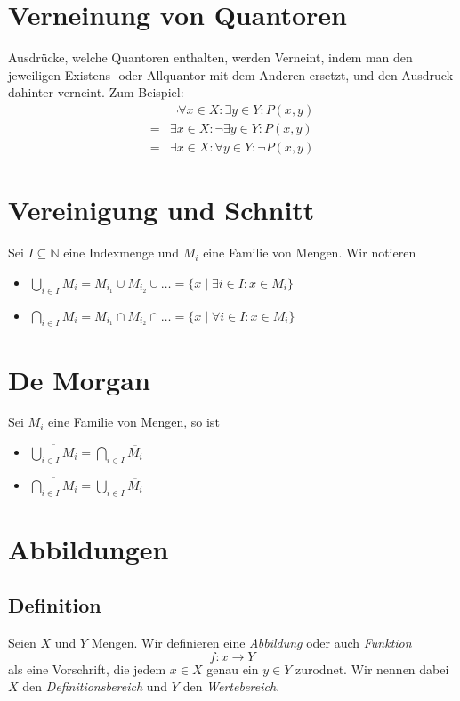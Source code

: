 \documentclass{scrreprt}
\newcommand{\NN}{\mathbb{N}}
\begin{document}
	\section{Verneinung von Quantoren}
	Ausdrücke, welche Quantoren enthalten, werden Verneint, indem man den jeweiligen Existens- oder Allquantor mit dem Anderen ersetzt, und den Ausdruck dahinter verneint. Zum Beispiel:
	\begin{align*}
 		& \neg \forall x \in X: \exists y \in Y : P (x,y)\\
		=& \exists x \in X: \neg \exists y \in Y : P(x,y)\\
		=& \exists x \in X: \forall y \in Y: \neg P(x,y)
	\end{align*}

	\section{Vereinigung und Schnitt}
	Sei $I \subseteq \NN$ eine Indexmenge und $M_i$ eine Familie von Mengen. Wir notieren
	\begin{itemize}
		\item
			$\bigcup\limits_{i \in I} M_i = M_{i_1} \cup M_{i_2} \cup \dots = \lbrace x \mid \exists i \in I: x \in M_i\rbrace$
		\item
			$\bigcap\limits_{i \in I} M_i = M_{i_1} \cap M_{i_2} \cap \dots = \lbrace x \mid \forall i \in I: x \in M_i\rbrace$
	\end{itemize}

	\section{De Morgan}
	Sei $M_i$ eine Familie von Mengen, so ist
	\begin{itemize}
		\item
			 $\overline{\bigcup\limits_{i \in I} M_i} = \bigcap\limits_{i \in I} \overline{M_i} $
		\item
			 $\overline{\bigcap\limits_{i \in I} M_i} = \bigcup\limits_{i \in I} \overline{M_i} $
	\end{itemize}

	\section{Abbildungen}
	\subsection{Definition}
	 	Seien $X$ und $Y$ Mengen. Wir definieren eine \emph{Abbildung} oder auch \emph{Funktion}
	 	\begin{equation*}
	 		f: x \longrightarrow Y
	 	\end{equation*}
	 	als eine Vorschrift, die jedem $x \in X$ genau ein $y \in Y$ zurodnet. Wir nennen dabei $X$ den \emph{Definitionsbereich} und $Y$ den \emph{Wertebereich}.
\end{document}

